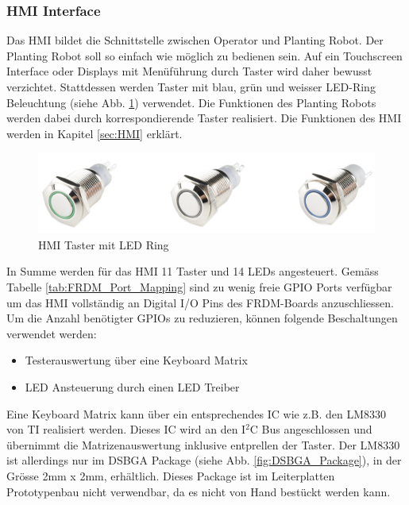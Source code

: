 \subsubsection{HMI Interface} \label{sec:Mainboard_HMI_Interface}
Das HMI bildet die Schnittstelle zwischen Operator und Planting Robot. Der Planting Robot soll so einfach wie möglich zu bedienen sein. Auf ein Touchscreen Interface oder Displays mit Menüführung durch Taster wird daher bewusst verzichtet. Stattdessen werden Taster mit blau, grün und weisser LED-Ring Beleuchtung (siehe Abb. \ref{fig:Taster_LED-Ring}) verwendet. Die Funktionen des Planting Robots werden dabei durch korrespondierende Taster realisiert. Die Funktionen des HMI werden in Kapitel \ref{sec:HMI} erklärt.
\begin{figure}[H]
	\includegraphics[draft=false,width=1\textwidth]{Illustrationen/6-Umsetzung/HMI_LED_Taster.png}
	\caption{HMI Taster mit LED Ring \protect\cite{HMI_Taster}}
	\label{fig:Taster_LED-Ring}
\end{figure}

In Summe werden für das HMI 11 Taster und 14 LEDs angesteuert. Gemäss Tabelle \ref{tab:FRDM_Port_Mapping} sind zu wenig freie GPIO Ports verfügbar um das HMI vollständig an Digital I/O Pins des FRDM-Boards anzuschliessen. Um die Anzahl benötigter GPIOs zu reduzieren, können folgende Beschaltungen verwendet werden:
\begin{itemize}
	\item Testerauswertung über eine Keyboard Matrix
	\item LED Ansteuerung durch einen LED Treiber
\end{itemize}

Eine Keyboard Matrix kann über ein entsprechendes IC wie z.B. den LM8330 von TI realisiert werden. Dieses IC wird an den I$^2$C Bus angeschlossen und übernimmt die Matrizenauswertung inklusive entprellen der Taster. Der LM8330 ist allerdings nur im DSBGA Package (siehe Abb. \ref{fig:DSBGA_Package}), in der Grösse 2mm x 2mm, erhältlich. Dieses Package ist im Leiterplatten Prototypenbau nicht verwendbar, da es nicht von Hand bestückt werden kann.\newline

